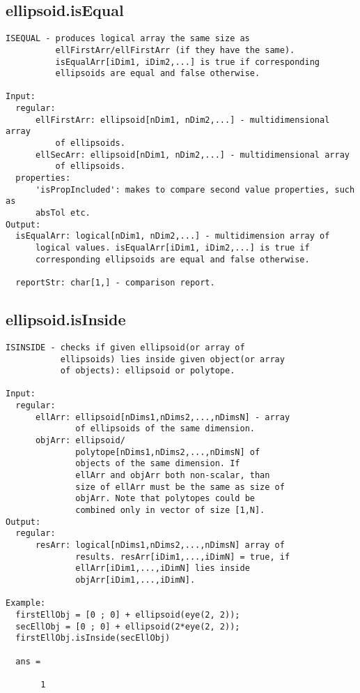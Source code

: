 \subsection{\texorpdfstring{ellipsoid.isEqual}{isEqual}}\label{method:ellipsoid.isEqual}
\begin{verbatim}
ISEQUAL - produces logical array the same size as
          ellFirstArr/ellFirstArr (if they have the same).
          isEqualArr[iDim1, iDim2,...] is true if corresponding
          ellipsoids are equal and false otherwise.

Input:
  regular:
      ellFirstArr: ellipsoid[nDim1, nDim2,...] - multidimensional array
          of ellipsoids.
      ellSecArr: ellipsoid[nDim1, nDim2,...] - multidimensional array
          of ellipsoids.
  properties:
      'isPropIncluded': makes to compare second value properties, such as
      absTol etc.
Output:
  isEqualArr: logical[nDim1, nDim2,...] - multidimension array of
      logical values. isEqualArr[iDim1, iDim2,...] is true if
      corresponding ellipsoids are equal and false otherwise.

  reportStr: char[1,] - comparison report.
\end{verbatim}
\subsection{\texorpdfstring{ellipsoid.isInside}{isInside}}\label{method:ellipsoid.isInside}
\begin{verbatim}
ISINSIDE - checks if given ellipsoid(or array of
           ellipsoids) lies inside given object(or array
           of objects): ellipsoid or polytope.

Input:
  regular:
      ellArr: ellipsoid[nDims1,nDims2,...,nDimsN] - array
              of ellipsoids of the same dimension.
      objArr: ellipsoid/
              polytope[nDims1,nDims2,...,nDimsN] of
              objects of the same dimension. If
              ellArr and objArr both non-scalar, than
              size of ellArr must be the same as size of
              objArr. Note that polytopes could be
              combined only in vector of size [1,N].
Output:
  regular:
      resArr: logical[nDims1,nDims2,...,nDimsN] array of
              results. resArr[iDim1,...,iDimN] = true, if
              ellArr[iDim1,...,iDimN] lies inside
              objArr[iDim1,...,iDimN].

Example:
  firstEllObj = [0 ; 0] + ellipsoid(eye(2, 2));
  secEllObj = [0 ; 0] + ellipsoid(2*eye(2, 2));
  firstEllObj.isInside(secEllObj)

  ans =

       1
\end{verbatim}
